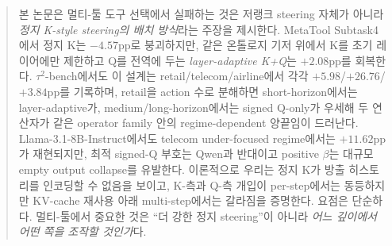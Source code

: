 \begin{abstract}
본 논문은 멀티-툴 도구 선택에서 실패하는 것은 저랭크 steering 자체가 아니라 \emph{정지 K-style steering의 배치 방식}라는 주장을 제시한다. MetaTool Subtask4에서 정지 K는 $-4.57$pp로 붕괴하지만, 같은 온톨로지 기저 위에서 K를 초기 레이어에만 제한하고 Q를 전역에 두는 \emph{layer-adaptive K+Q}는 $+2.08$pp를 회복한다. $\tau^2$-bench에서도 이 설계는 retail/telecom/airline에서 각각 $+5.98$/$+26.76$/$+3.84$pp를 기록하며, retail을 action 수로 분해하면 short-horizon에서는 layer-adaptive가, medium/long-horizon에서는 signed Q-only가 우세해 두 연산자가 같은 operator family 안의 regime-dependent 양끝임이 드러난다. Llama-3.1-8B-Instruct에서도 telecom under-focused regime에서는 $+11.62$pp가 재현되지만, 최적 signed-Q 부호는 Qwen과 반대이고 positive $\beta$는 대규모 empty output collapse를 유발한다. 이론적으로 우리는 정지 K가 방출 히스토리를 인코딩할 수 없음을 보이고, K-측과 Q-측 개입이 per-step에서는 동등하지만 KV-cache 재사용 아래 multi-step에서는 갈라짐을 증명한다. 요점은 단순하다. 멀티-툴에서 중요한 것은 ``더 강한 정지 steering''이 아니라 \emph{어느 깊이에서 어떤 쪽을 조작할 것인가}다.
\end{abstract}
